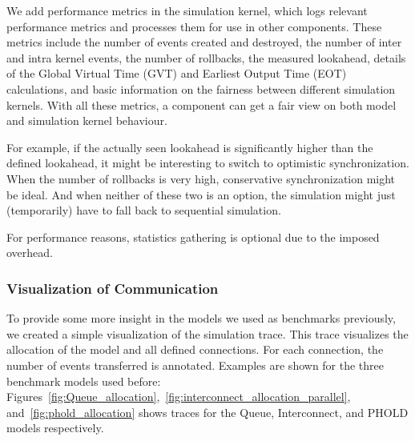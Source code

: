 We add performance metrics in the simulation kernel, which logs relevant performance metrics and processes them for use in other components.
These metrics include the number of events created and destroyed, the number of inter and intra kernel events, the number of rollbacks, the measured lookahead, details of the Global Virtual Time (GVT) and Earliest Output Time (EOT) calculations, and basic information on the fairness between different simulation kernels.
With all these metrics, a component can get a fair view on both model and simulation kernel behaviour.

For example, if the actually seen lookahead is significantly higher than the defined lookahead, it might be interesting to switch to optimistic synchronization.
When the number of rollbacks is very high, conservative synchronization might be ideal.
And when neither of these two is an option, the simulation might just (temporarily) have to fall back to sequential simulation.

For performance reasons, statistics gathering is optional due to the imposed overhead.

\subsubsection{Visualization of Communication}
To provide some more insight in the models we used as benchmarks previously, we created a simple visualization of the simulation trace.
This trace visualizes the allocation of the model and all defined connections.
For each connection, the number of events transferred is annotated.
Examples are shown for the three benchmark models used before: Figures~\ref{fig:Queue_allocation},~\ref{fig:interconnect_allocation_parallel}, and~\ref{fig:phold_allocation} shows traces for the Queue, Interconnect, and PHOLD models respectively.

